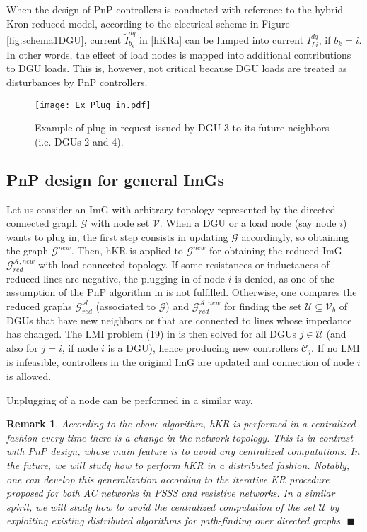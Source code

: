 \documentclass[a4paper]{article}
\theoremstyle{plain}
\newtheorem{rmk}{Remark}
\newcommand{\AAA}{{\mathcal A}}
\newcommand{\CC}{{\mathcal C}}
\newcommand{\GG}{{\mathcal G}}
\newcommand{\UU}{{\mathcal U}}
\newcommand{\VV}{{\mathcal V}}
\begin{document}
When the design of PnP controllers is conducted with reference to the hybrid Kron reduced model, according to the electrical scheme in Figure \ref{fig:schema1DGU}, current $\tilde I_{b_k}^{dq}$ in \eqref{hKRa} can be lumped into current $I_{Li}^{dq}$, if $b_k = i$. In other words, the effect of load nodes is mapped into additional contributions to DGU loads. This is, however, not critical because DGU loads are treated as disturbances by PnP controllers.

  \begin{figure}
		\centering
		\texttt{[image: Ex\_Plug\_in.pdf]}
\caption{Example of plug-in request issued by DGU 3 to its future neighbors (i.e. DGUs 2 and 4).}
		\label{fig:Ex_plugin_req}
	\end{figure}

\subsection{PnP design for general ImGs}
\label{sec:PnPdesfen}
Let us consider an ImG with arbitrary topology represented by the directed connected graph $\GG$ with node set $\VV$. When a DGU or a load node (say node $i$) wants to plug in, the first step consists in updating $\GG$ accordingly, so obtaining the graph $\GG^{new}$. Then, hKR is applied to $\GG^{new}$ for obtaining the reduced ImG $\GG_{red}^{\AAA,new}$ with load-connected topology. If some resistances or inductances of reduced lines are negative, the plugging-in of node $i$ is denied, as one of the assumption of the PnP algorithm in \cite{riverso2015plug} is not fulfilled. Otherwise, one compares the reduced graphs $\GG_{red}^{\AAA}$ (associated to $\GG$) and $\GG_{red}^{\AAA,new}$ for finding the set $\UU\subseteq\VV_b$ of DGUs that have new neighbors or that are connected to lines whose impedance has changed. The LMI problem (19) in \cite{riverso2015plug} is then solved for all DGUs $j\in\UU$ (and also for $j=i$, if node $i$ is a DGU), hence producing new controllers $\CC_j$. If no LMI is infeasible, controllers in the original ImG are updated and connection of node $i$ is allowed.

Unplugging of a node can be performed in a similar way.
\begin{rmk}
\label{rmk:new}
According to the above algorithm, hKR is performed in a centralized fashion every time there is a change in the network topology. This is in contrast with PnP design, whose main feature is to avoid any centralized computations. In the future, we will study how to perform hKR in a distributed fashion. Notably, one can develop this generalization according to the iterative KR procedure \cite{dorfler2013kron} proposed for both AC networks in PSSS and resistive networks. In a similar spirit, we will study how to avoid the centralized computation of the set $\UU$ by exploiting existing distributed algorithms for path-finding over directed graphs. 
\hspace{75mm}$\blacksquare$
\end{rmk}
\end{document}
